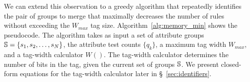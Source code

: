 We can extend this observation to a greedy algorithm that repeatedly
identifies the pair of groups to merge that maximally decreases the
number of rules without exceeding the $W_{max}$ tag size.
Algorithm~\ref{alg:memory_min} shows the pseudocode.  The algorithm
takes as input a set of attribute groups $\mathbb{S} = \{s_1, s_2, \dots,
s_N\}$, the attribute test counts $\{q_k\}$, a maximum tag width
$W_{max}$, and a tag-width calculator $W()$.  The tag-width calculator
determines the number of bits in the tag, given the current set of
groups $\mathbb{S}$.  We present closed-form equations for the tag-width
calculator later in \S~\ref{sec:identifiers}.

